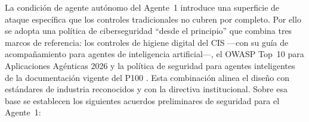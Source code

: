 \documentclass[a4paper, 12pt]{article}
\begin{document}
La condici\'on de agente aut\'onomo del Agente~1 introduce una superficie de ataque espec\'ifica que los controles tradicionales no cubren por completo. Por ello se adopta una pol\'itica de ciberseguridad ``desde el principio'' que combina tres marcos de referencia: los controles de higiene digital del \ac{CIS} ---con su gu\'ia de acompa\~namiento para agentes de inteligencia artificial---, el \ac{OWASP} Top~10 para Aplicaciones Ag\'enticas 2026 y la pol\'itica de seguridad para agentes inteligentes de la documentaci\'on vigente del \ac{P100} \parencite{ciscontrols2024, owaspagentic2026, cicerchia2026procesos}. Esta combinaci\'on alinea el dise\~no con est\'andares de industria reconocidos y con la directiva institucional. Sobre esa base se establecen los siguientes acuerdos preliminares de seguridad para el Agente~1:
\end{document}
